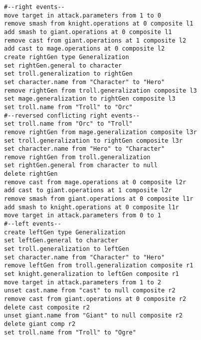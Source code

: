 \begin{lstlisting}[firstnumber=1,style=eol,caption={Merged change events (operations) of the models in Fig. \ref{fig:class_diagram_rpg} and Listings \ref{lst:cbp_right} and \ref{lst:cbp_left} using EMF Store. The commented lines are added only to improve readability.},label=lst:cbp_merged_emfs]
#--right events--
move target in attack.parameters from 1 to 0
remove smash from knight.operations at 0 composite l1
add smash to giant.operations at 0 composite l1
remove cast from giant.operations at 1 composite l2
add cast to mage.operations at 0 composite l2
create rightGen type Generalization
set rightGen.general to character
set troll.generalization to rightGen
set character.name from "Character" to "Hero"
remove rightGen from troll.generalization composite l3
set mage.generalization to rightGen composite l3
set troll.name from "Troll" to "Orc"
#--reversed conflicting right events--
set troll.name from "Orc" to "Troll"
remove rightGen from mage.generalization composite l3r
set troll.generalization to rightGen composite l3r
set character.name from "Hero" to "Character"
remove rightGen from troll.generalization
set rightGen.general from character to null
delete rightGen
remove cast from mage.operations at 0 composite l2r
add cast to giant.operations at 1 composite l2r
remove smash from giant.operations at 0 composite l1r
add smash to knight.operations at 0 composite l1r
move target in attack.parameters from 0 to 1
#--left events--
create leftGen type Generalization
set leftGen.general to character
set troll.generalization to leftGen
set character.name from "Character" to "Hero"
remove leftGen from troll.generalization composite r1
set knight.generalization to leftGen composite r1
move target in attack.parameters from 1 to 2
unset cast.name from "cast" to null composite r2
remove cast from giant.operations at 0 composite r2
delete cast composite r2
unset giant.name from "Giant" to null composite r2
delete giant comp r2
set troll.name from "Troll" to "Ogre"
\end{lstlisting}


